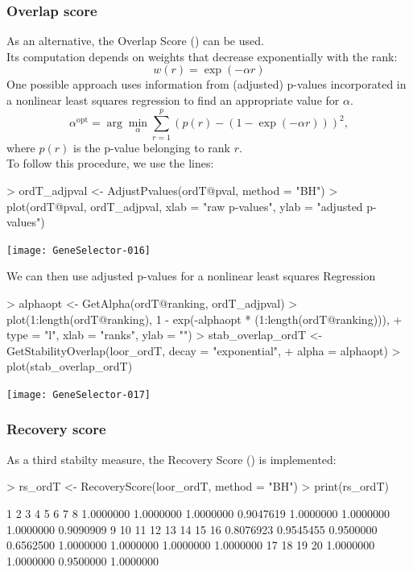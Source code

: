 \subsubsection{Overlap score}
As an
alternative, the Overlap Score (\citet{Lottaz1}) can be used.\\
Its computation depends on weights that decrease exponentially with the rank:
\begin{equation*}
w(r) = \exp(-\alpha r)
\end{equation*}
One possible approach uses information from (adjusted) p-values incorporated
in a nonlinear least squares regression to find an appropriate value for
$\alpha$.
\begin{equation*}
\alpha^{\text{opt}} = \arg \min_{\alpha} \sum_{r=1}^p  (p(r) - (1 - \exp(-\alpha r)))^2,
\end{equation*}
where $p(r)$ is the p-value belonging to rank $r$.\\
To follow this procedure, we use the lines:

\begin{Schunk}
\begin{Sinput}
> ordT_adjpval <- AdjustPvalues(ordT@pval, method = "BH")
> plot(ordT@pval, ordT_adjpval, xlab = "raw p-values", ylab = "adjusted p-values")
\end{Sinput}
\end{Schunk}
\texttt{[image: GeneSelector-016]}

We can then use adjusted p-values for a nonlinear least squares Regression

\begin{Schunk}
\begin{Sinput}
> alphaopt <- GetAlpha(ordT@ranking, ordT_adjpval)
> plot(1:length(ordT@ranking), 1 - exp(-alphaopt * (1:length(ordT@ranking))), 
+     type = "l", xlab = "ranks", ylab = "")
> stab_overlap_ordT <- GetStabilityOverlap(loor_ordT, decay = "exponential", 
+     alpha = alphaopt)
> plot(stab_overlap_ordT)
\end{Sinput}
\end{Schunk}
\texttt{[image: GeneSelector-017]}

\subsubsection{Recovery score}
As a third stabilty measure, the Recovery Score (\citet{Pavlidis1})
is implemented:

\begin{Schunk}
\begin{Sinput}
> rs_ordT <- RecoveryScore(loor_ordT, method = "BH")
> print(rs_ordT)
\end{Sinput}
\begin{Soutput}
        1         2         3         4         5         6         7         8 
1.0000000 1.0000000 1.0000000 0.9047619 1.0000000 1.0000000 1.0000000 0.9090909 
        9        10        11        12        13        14        15        16 
0.8076923 0.9545455 0.9500000 0.6562500 1.0000000 1.0000000 1.0000000 1.0000000 
       17        18        19        20 
1.0000000 1.0000000 0.9500000 1.0000000 
\end{Soutput}
\end{Schunk}

